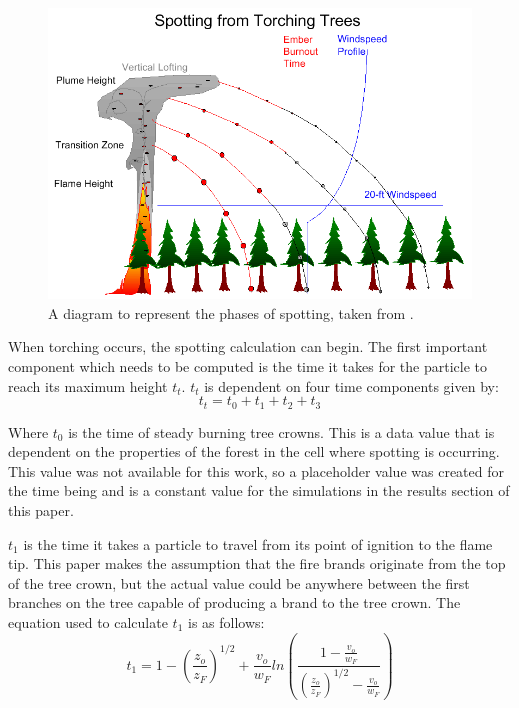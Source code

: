 \begin{figure}%
\centering
  \includegraphics[width=\textwidth]{figures/implementation/spotting_diagram.png}
  \caption{A diagram to represent the phases of spotting, taken from \cite{firebehaveref}.}
  \label{fig:spot_diagram}
\end{figure}

When torching occurs, the spotting calculation can begin. The first important component which needs to be computed is the time it takes for the particle to reach its maximum height $t_t$. $t_t$ is dependent on four time components given by: 
\begin{equation}
t_t = t_0 + t_1 + t_2 + t_3
\end{equation}

Where $t_0$ is the time of steady burning tree crowns. This is a data value that is dependent on the properties of the forest in the cell where spotting is occurring. This value was not available for this work, so a placeholder value was created for the time being and is a constant value for the simulations in the results section of this paper. 

$t_1$ is the time it takes a particle to travel from its point of ignition to the flame tip. This paper makes the assumption that the fire brands originate from the top of the tree crown, but the actual value could be anywhere between the first branches on the tree capable of producing a brand to the tree crown. The equation used to calculate $t_1$ is as follows: 
\begin{equation}
t_1 = 1 - (\frac{z_o}{z_F})^{1/2} + \frac{v_o}{w_F}ln(\frac{1-\frac{v_o}{w_F}}{(\frac{z_o}{z_F})^{1/2} - \frac{v_o}{w_F}})
\end{equation}

